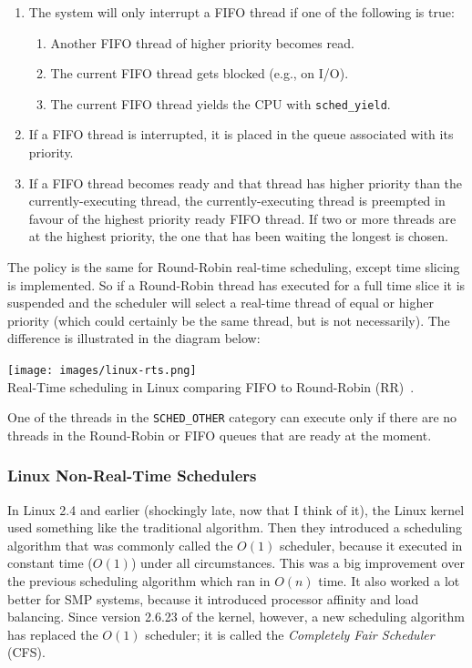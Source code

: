 \begin{enumerate}
	\item The system will only interrupt a FIFO thread if one of the following is true:
	\begin{enumerate}
		\item Another FIFO thread of higher priority becomes read.
		\item The current FIFO thread gets blocked (e.g., on I/O).
		\item The current FIFO thread yields the CPU with \texttt{sched\_yield}.
	\end{enumerate}
	\item If a FIFO thread is interrupted, it is placed in the queue associated with its priority.
	\item If a FIFO thread becomes ready and that thread has higher priority than the currently-executing thread, the currently-executing thread is preempted in favour of the highest priority ready FIFO thread. If two or more threads are at the highest priority, the one that has been waiting the longest is chosen.
\end{enumerate}

The policy is the same for Round-Robin real-time scheduling, except time slicing is implemented. So if a Round-Robin thread has executed for a full time slice it is suspended and the scheduler will select a real-time thread of equal or higher priority (which could certainly be the same thread, but is not necessarily). The difference is illustrated in the diagram below:

\begin{center}
	\texttt{[image: images/linux-rts.png]}\\
	Real-Time scheduling in Linux comparing FIFO to Round-Robin (RR)~\cite{osi}.
\end{center}

One of the threads in the \texttt{SCHED\_OTHER} category can execute only if there are no threads in the Round-Robin or FIFO queues that are ready at the moment.

\subsubsection*{Linux Non-Real-Time Schedulers}
In Linux 2.4 and earlier (shockingly late, now that I think of it), the Linux kernel used something like the traditional algorithm. Then they introduced a scheduling algorithm that was commonly called the $O(1)$ scheduler, because it executed in constant time ($O(1)$) under all circumstances. This was a big improvement over the previous scheduling algorithm which ran in $O(n)$ time. It also worked a lot better for SMP systems, because it introduced processor affinity and load balancing. Since version 2.6.23 of the kernel, however, a new scheduling algorithm has replaced the $O(1)$ scheduler; it is called the \textit{Completely Fair Scheduler} (CFS).

